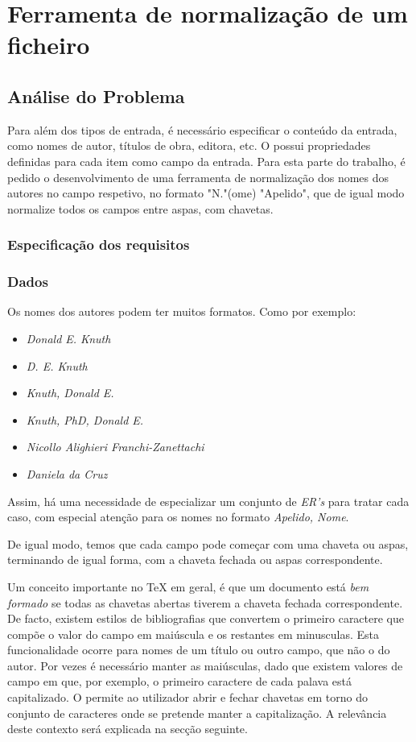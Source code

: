 \chapter{Ferramenta de normalização de um ficheiro }
\label{chap:b1}



\section{Análise do Problema}
\label{sec:b1p:b1}
Para além dos tipos de entrada, é necessário especificar o conteúdo da entrada,
como nomes de autor, títulos de obra, editora, etc. O  possui
propriedades definidas para cada item como campo da entrada.  
Para esta parte do trabalho, é pedido o desenvolvimento de uma ferramenta de
normalização dos nomes dos autores no campo respetivo, no formato "N."(ome)
"Apelido", que de igual modo normalize todos os campos entre aspas, com
chavetas. 

\subsection{Especificação dos requisitos}
\label{sec:spec:b1}

\subsection{Dados}
Os nomes dos autores podem ter muitos formatos. Como por exemplo:

\begin{itemize}
	\item \emph{Donald E. Knuth}
	\item \emph{D. E. Knuth}
	\item \emph{Knuth, Donald E.}
	\item \emph{Knuth, PhD, Donald E.}
	\item \emph{Nicollo Alighieri Franchi-Zanettachi}
	\item \emph{Daniela da Cruz}
\end{itemize}

Assim, há uma necessidade de especializar um conjunto de \emph{ER's} para tratar
cada caso, com especial atenção para os nomes no formato \emph{Apelido, Nome}.

De igual modo, temos que cada campo pode começar com uma chaveta ou aspas,
terminando de igual forma, com a chaveta fechada ou aspas correspondente.

Um conceito importante no \TeX{} em geral, é que um documento está \emph{bem
formado} se todas as chavetas abertas tiverem a chaveta fechada correspondente.
De facto, existem estilos de bibliografias que convertem o primeiro caractere
que compõe o valor do campo em maiúscula e os restantes em minusculas. Esta
funcionalidade ocorre para nomes de um título ou outro campo, que não o do
autor. Por vezes é necessário manter as maiúsculas, dado que existem valores de
campo em que, por exemplo, o primeiro caractere de cada palava está
capitalizado. O  permite ao utilizador abrir e fechar chavetas em
torno do conjunto de caracteres onde se pretende manter a capitalização.
A relevância deste contexto será explicada na secção seguinte.


